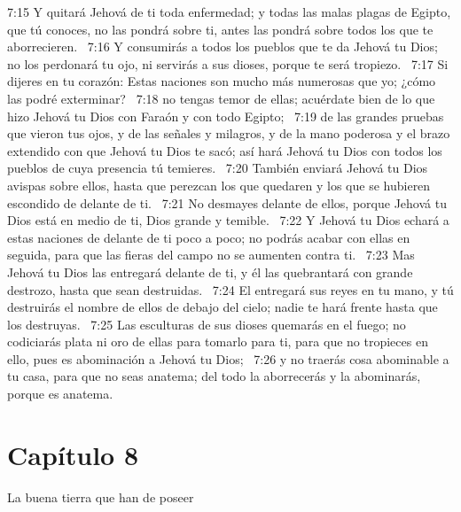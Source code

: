 7:15 Y quitará Jehová de ti toda enfermedad; y todas las malas plagas de Egipto, que tú conoces, no las pondrá sobre ti, antes las pondrá sobre todos los que te aborrecieren.  
7:16 Y consumirás a todos los pueblos que te da Jehová tu Dios; no los perdonará tu ojo, ni servirás a sus dioses, porque te será tropiezo.  
7:17 Si dijeres en tu corazón: Estas naciones son mucho más numerosas que yo; ¿cómo las podré exterminar?  
7:18 no tengas temor de ellas; acuérdate bien de lo que hizo Jehová tu Dios con Faraón y con todo Egipto;  
7:19 de las grandes pruebas que vieron tus ojos, y de las señales y milagros, y de la mano poderosa y el brazo extendido con que Jehová tu Dios te sacó; así hará Jehová tu Dios con todos los pueblos de cuya presencia tú temieres.  
7:20 También enviará Jehová tu Dios avispas sobre ellos, hasta que perezcan los que quedaren y los que se hubieren escondido de delante de ti.  
7:21 No desmayes delante de ellos, porque Jehová tu Dios está en medio de ti, Dios grande y temible.  
7:22 Y Jehová tu Dios echará a estas naciones de delante de ti poco a poco; no podrás acabar con ellas en seguida, para que las fieras del campo no se aumenten contra ti.  
7:23 Mas Jehová tu Dios las entregará delante de ti, y él las quebrantará con grande destrozo, hasta que sean destruidas.  
7:24 El entregará sus reyes en tu mano, y tú destruirás el nombre de ellos de debajo del cielo; nadie te hará frente hasta que los destruyas.  
7:25 Las esculturas de sus dioses quemarás en el fuego; no codiciarás plata ni oro de ellas para tomarlo para ti, para que no tropieces en ello, pues es abominación a Jehová tu Dios;  
7:26 y no traerás cosa abominable a tu casa, para que no seas anatema; del todo la aborrecerás y la abominarás, porque es anatema.  
\section*{Capítulo 8 }
La buena tierra que han de poseer  

